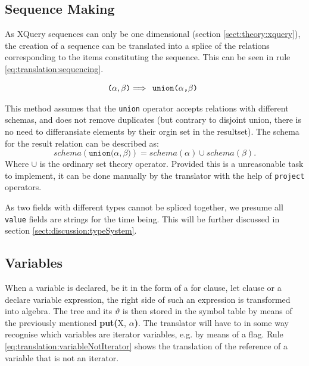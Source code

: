 \subsection{Sequence Making}
\label{sect:translation:mXr:sequencing}
As XQuery sequences can only be one dimensional (section
\ref{sect:theory:xquery}), the creation of a sequence can be translated into a
splice of the relations corresponding to the items constituting the sequence.
This can be seen in rule \ref{eq:translation:sequencing}. 

\begin{equation}
\centering
\texttt{(} \alpha , \beta \texttt{)}
\Longrightarrow
\begin{array}{l}
\mbox{\texttt{union(}} 
\alpha \mbox{\texttt{,}} 
\beta \mbox{\texttt{)}}
\end{array}
\label{eq:translation:sequencing}
\end{equation}

This method assumes that the \texttt{union} operator accepts relations with
different schemas, and does not remove duplicates (but contrary to disjoint
union, there is no need to differansiate elements by their orgin set in the
resultset). The schema for the result relation can be described as:
\begin{equation*}
schema(\texttt{union(}\alpha, \beta\texttt{)}) = schema(\alpha) \cup
schema(\beta).
\end{equation*}
Where $\cup$ is the ordinary set theory operator. Provided this is a
unreasonable task to implement, it can be done manually by the translator with
the help of \texttt{project} operators.

As two fields with different types cannot be spliced together, we presume all
\texttt{value} fields are strings for the time being. This will be further
discussed in section \ref{sect:discussion:typeSystem}.

\subsection{Variables}

\label{sect:translation:mXr:variables}
When a variable is declared, be it in the form of a \textsf{for} clause, \textsf{let} clause or a \textsf{declare
variable} expression, the right side of such an expression is transformed into algebra. The tree and its
$\vartheta$ is then stored in the symbol table by means of the previously mentioned \textbf{put(}\textsf{X},
$\alpha$\textbf{)}. The translator will have to in some way recognise which variables are iterator variables, e.g.
by means of a flag. Rule \ref{eq:translation:variableNotIterator} shows the translation of the reference of a
variable that is not an iterator.


